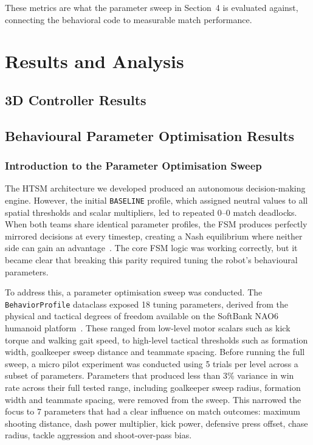 \documentclass[12pt, a4paper]{report}
\begin{document}
These metrics are what the parameter sweep in Section~4 is evaluated
against, connecting the behavioral code to measurable match performance.


\chapter{Results and Analysis}

\section{3D Controller Results}


\section{Behavioural Parameter Optimisation Results}

\subsection{Introduction to the Parameter Optimisation Sweep}

The HTSM architecture we developed produced an autonomous decision-making
engine. However, the initial \texttt{BASELINE} profile, which assigned
neutral values to all spatial thresholds and scalar multipliers, led to
repeated 0--0 match deadlocks.
When both teams share identical parameter profiles, the FSM produces
perfectly mirrored decisions at every timestep, creating a Nash equilibrium
where neither side can gain an advantage~\cite{nash1950}.
The core FSM logic was working correctly, but it became clear that breaking
this parity required tuning the robot's behavioural parameters.

To address this, a parameter optimisation sweep was conducted.
The \texttt{BehaviorProfile} dataclass exposed 18 tuning parameters,
derived from the physical and tactical degrees of freedom available on the
SoftBank NAO6 humanoid platform~\cite{nao6specs}.
These ranged from low-level motor scalars such as kick torque and walking
gait speed, to high-level tactical thresholds such as formation width,
goalkeeper sweep distance and teammate spacing.
Before running the full sweep, a micro pilot experiment was conducted using
5 trials per level across a subset of parameters.
Parameters that produced less than 3\% variance in win rate across their
full tested range, including goalkeeper sweep radius, formation width
and teammate spacing, were removed from the sweep.
This narrowed the focus to 7 parameters that had a clear influence on match
outcomes: maximum shooting distance, dash power multiplier, kick power,
defensive press offset, chase radius, tackle aggression and shoot-over-pass
bias.
\end{document}
